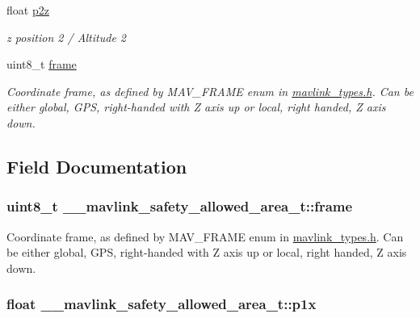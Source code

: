 \begin{DoxyCompactItemize}
float \hyperlink{struct____mavlink__safety__allowed__area__t_a9af8420ae1c69890ec5dfafd54785d91}{p2z}
\begin{DoxyCompactList}\small\item\em z position 2 / Altitude 2 \end{DoxyCompactList}\item 
uint8\+\_\+t \hyperlink{struct____mavlink__safety__allowed__area__t_a8b809d2612e4c0ccb4a7d89841fa509c}{frame}
\begin{DoxyCompactList}\small\item\em Coordinate frame, as defined by M\+A\+V\+\_\+\+F\+R\+A\+M\+E enum in \hyperlink{mavlink__types_8h}{mavlink\+\_\+types.\+h}. Can be either global, G\+P\+S, right-\/handed with Z axis up or local, right handed, Z axis down. \end{DoxyCompactList}\end{DoxyCompactItemize}


\subsection{Field Documentation}
\hypertarget{struct____mavlink__safety__allowed__area__t_a8b809d2612e4c0ccb4a7d89841fa509c}{
\subsubsection[{frame}]{\setlength{\rightskip}{0pt plus 5cm}uint8\+\_\+t \+\_\+\+\_\+mavlink\+\_\+safety\+\_\+allowed\+\_\+area\+\_\+t\+::frame}}\label{struct____mavlink__safety__allowed__area__t_a8b809d2612e4c0ccb4a7d89841fa509c}


Coordinate frame, as defined by M\+A\+V\+\_\+\+F\+R\+A\+M\+E enum in \hyperlink{mavlink__types_8h}{mavlink\+\_\+types.\+h}. Can be either global, G\+P\+S, right-\/handed with Z axis up or local, right handed, Z axis down. 

\hypertarget{struct____mavlink__safety__allowed__area__t_ae919b7b7d619c59c1cd250efb99b0417}{
\subsubsection[{p1x}]{\setlength{\rightskip}{0pt plus 5cm}float \+\_\+\+\_\+mavlink\+\_\+safety\+\_\+allowed\+\_\+area\+\_\+t\+::p1x}}\label{struct____mavlink__safety__allowed__area__t_ae919b7b7d619c59c1cd250efb99b0417}


